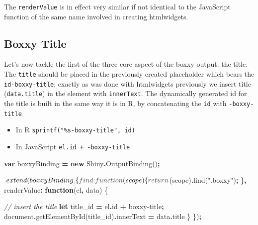 \documentclass[
]{krantz}
\makeatletter
\newenvironment{Shaded}{\begin{snugshade}}{\end{snugshade}}
\newcommand{\AttributeTok}[1]{\textcolor[rgb]{0.61,0.61,0.61}{#1}}
\newcommand{\BuiltInTok}[1]{#1}
\newcommand{\CommentTok}[1]{\textcolor[rgb]{0.37,0.37,0.37}{\textit{#1}}}
\newcommand{\ControlFlowTok}[1]{\textcolor[rgb]{0.27,0.27,0.27}{\textbf{#1}}}
\newcommand{\DataTypeTok}[1]{\textcolor[rgb]{0.27,0.27,0.27}{#1}}
\newcommand{\FunctionTok}[1]{\textcolor[rgb]{0,0,0}{#1}}
\newcommand{\KeywordTok}[1]{\textcolor[rgb]{0.27,0.27,0.27}{\textbf{#1}}}
\newcommand{\NormalTok}[1]{#1}
\newcommand{\OperatorTok}[1]{\textcolor[rgb]{0.43,0.43,0.43}{\textbf{#1}}}
\newcommand{\StringTok}[1]{\textcolor[rgb]{0.5,0.5,0.5}{#1}}
\providecommand{\tightlist}{%
  \setlength{\itemsep}{0pt}\setlength{\parskip}{0pt}}
\newenvironment{kframe}{%
\medskip{}
\setlength{\fboxsep}{.8em}
 \def\at@end@of@kframe{}%
 \ifinner\ifhmode%
  \def\at@end@of@kframe{\end{minipage}}%
  \begin{minipage}{\columnwidth}%
 \fi\fi%
 \def\FrameCommand##1{\hskip\@totalleftmargin \hskip-\fboxsep
 \colorbox{shadecolor}{##1}\hskip-\fboxsep
     \hskip-\linewidth \hskip-\@totalleftmargin \hskip\columnwidth}%
 \MakeFramed {\advance\hsize-\width
   \@totalleftmargin\z@ \linewidth\hsize
   \@setminipage}}%
 {\par\unskip\endMakeFramed%
 \at@end@of@kframe}
\renewenvironment{Shaded}{\begin{kframe}}{\end{kframe}}
\newenvironment{rmdblock}[1]
  {
  \begin{itemize}
  \renewcommand{\labelitemi}{
    \raisebox{-.7\height}[0pt][0pt]{
      {\setkeys{Gin}{width=3em,keepaspectratio}\texttt{[image: images/\#1]}}
    }
  }
  \setlength{\fboxsep}{1em}
  \begin{kframe}
  \item
  }
  {
  \end{kframe}
  \end{itemize}
  }
\newenvironment{rmdnote}
  {\begin{rmdblock}{note}}
  {\end{rmdblock}}
\makeatother
\begin{document}
\begin{rmdnote}
The \texttt{renderValue} is in effect very similar if not identical to
the JavaScript function of the same name involved in creating
htmlwidgets.
\end{rmdnote}

\hypertarget{shiny-output-boxxy-title}{%
\subsection{Boxxy Title}\label{shiny-output-boxxy-title}}

Let's now tackle the first of the three core aspect of the boxxy output: the title. The \texttt{title} should be placed in the previously created placeholder which bears the \texttt{id-boxxy-title}; exactly as was done with htmlwidgets previously we insert title (\texttt{data.title}) in the element with \texttt{innerText}. The dynamically generated id for the title is built in the same way it is in R, by concatenating the \texttt{id} with \texttt{-boxxy-title}

\begin{itemize}
\tightlist
\item
  In R \texttt{sprintf("\%s-boxxy-title",\ id)}
\item
  In JavaScript \texttt{el.id\ +\ \textquotesingle{}-boxxy-title\textquotesingle{}}
\end{itemize}

\begin{Shaded}
\begin{Highlighting}[]
\KeywordTok{var}\NormalTok{ boxxyBinding }\OperatorTok{=} \KeywordTok{new}\NormalTok{ Shiny}\OperatorTok{.}\FunctionTok{OutputBinding}\NormalTok{()}\OperatorTok{;}

\NormalTok{$}\OperatorTok{.}\FunctionTok{extend}\NormalTok{(boxxyBinding}\OperatorTok{,}\NormalTok{ \{}
  \DataTypeTok{find}\OperatorTok{:} \KeywordTok{function}\NormalTok{(scope) \{}
    \ControlFlowTok{return}\NormalTok{ $(scope)}\OperatorTok{.}\FunctionTok{find}\NormalTok{(}\StringTok{".boxxy"}\NormalTok{)}\OperatorTok{;}
\NormalTok{  \}}\OperatorTok{,}
  \DataTypeTok{renderValue}\OperatorTok{:} \KeywordTok{function}\NormalTok{(el}\OperatorTok{,}\NormalTok{ data) \{}

    \CommentTok{// insert the title}
    \KeywordTok{let}\NormalTok{ title\_id }\OperatorTok{=}\NormalTok{ el}\OperatorTok{.}\AttributeTok{id} \OperatorTok{+} \StringTok{\textquotesingle{}{-}boxxy{-}title\textquotesingle{}}\OperatorTok{;}
    \BuiltInTok{document}\OperatorTok{.}\FunctionTok{getElementById}\NormalTok{(title\_id)}\OperatorTok{.}\AttributeTok{innerText} \OperatorTok{=}\NormalTok{ data}\OperatorTok{.}\AttributeTok{title}
\NormalTok{  \}}
\NormalTok{\})}\OperatorTok{;}
\end{Highlighting}
\end{Shaded}
\end{document}
